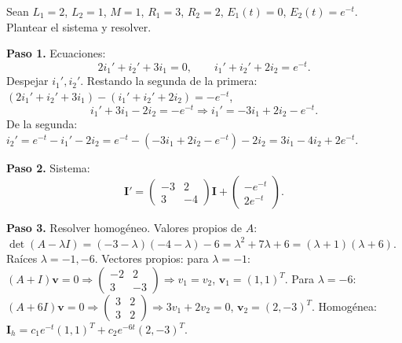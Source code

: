 \begin{example}
Sean $L_1=2$, $L_2=1$, $M=1$, $R_1=3$, $R_2=2$, $E_1(t)=0$, $E_2(t)=e^{-t}$. Plantear el sistema y resolver.
\begin{myproof}
\textbf{Paso 1.} Ecuaciones:
\[
2i_1'+i_2'+3i_1=0,\qquad i_1'+i_2'+2i_2=e^{-t}.
\]
Despejar $i_1', i_2'$. Restando la segunda de la primera: $(2i_1'+i_2'+3i_1)-(i_1'+i_2'+2i_2)= -e^{-t}$,
\[
i_1' + 3i_1 -2i_2 = -e^{-t}\Rightarrow i_1' = -3i_1+2i_2-e^{-t}.
\]
De la segunda: $i_2'=e^{-t}-i_1'-2i_2 = e^{-t}-(-3i_1+2i_2-e^{-t})-2i_2 = 3i_1 -4i_2+2e^{-t}$.

\textbf{Paso 2.} Sistema:
\[
\mathbf{I}'=
\begin{pmatrix}
-3&2\\
3&-4
\end{pmatrix}
\mathbf{I}
+
\begin{pmatrix}
-e^{-t}\\
2e^{-t}
\end{pmatrix}.
\]

\textbf{Paso 3.} Resolver homogéneo. Valores propios de $A$: $\det(A-\lambda I)=(-3-\lambda)(-4-\lambda)-6=\lambda^2+7\lambda+6=(\lambda+1)(\lambda+6)$. Raíces $\lambda=-1,-6$.
Vectores propios: para $\lambda=-1$: $(A+I)\mathbf{v}=0\Rightarrow
\begin{pmatrix}
-2&2\\
3&-3
\end{pmatrix}\Rightarrow v_1=v_2$, $\mathbf{v}_1=(1,1)^T$.
Para $\lambda=-6$: $(A+6I)\mathbf{v}=0\Rightarrow
\begin{pmatrix}
3&2\\
3&2
\end{pmatrix}\Rightarrow 3v_1+2v_2=0$, $\mathbf{v}_2=(2,-3)^T$.
Homogénea: $\mathbf{I}_h=c_1 e^{-t}(1,1)^T+c_2 e^{-6t}(2,-3)^T$.


\end{myproof}
\end{example}
